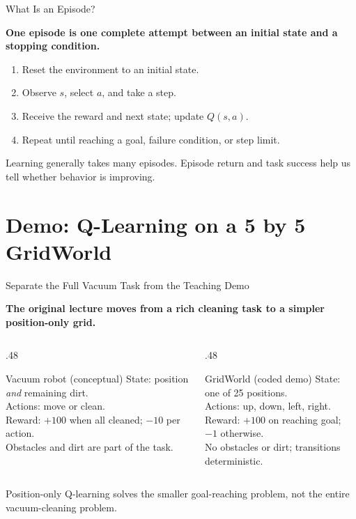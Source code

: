 \documentclass[aspectratio=169,10pt]{beamer}
\newcommand{\conceptlead}[1]{{\small\bfseries\color{CalPolyGreen}#1\par}}
\begin{document}
\begin{frame}{What Is an Episode?}
\small
\conceptlead{One episode is one complete attempt between an initial state and a stopping condition.}
\begin{enumerate}
\item Reset the environment to an initial state.
\item Observe $s$, select $a$, and take a step.
\item Receive the reward and next state; update $Q(s,a)$.
\item Repeat until reaching a goal, failure condition, or step limit.
\end{enumerate}
\begin{keyidea}Learning generally takes many episodes. Episode return and task success help us tell whether behavior is improving.\end{keyidea}
\end{frame}

\section{Demo: Q-Learning on a 5 by 5 GridWorld}

\begin{frame}{Separate the Full Vacuum Task from the Teaching Demo}
\small
\conceptlead{The original lecture moves from a rich cleaning task to a simpler position-only grid.}
\begin{columns}[T,onlytextwidth]
\begin{column}{.48\textwidth}
\begin{block}{Vacuum robot (conceptual)}
State: position \emph{and} remaining dirt.\\[4pt]
Actions: move or clean.\\[4pt]
Reward: $+100$ when all cleaned; $-10$ per action.\\[4pt]
Obstacles and dirt are part of the task.
\end{block}
\end{column}
\begin{column}{.48\textwidth}
\begin{block}{GridWorld (coded demo)}
State: one of 25 positions.\\[4pt]
Actions: up, down, left, right.\\[4pt]
Reward: $+100$ on reaching goal; $-1$ otherwise.\\[4pt]
No obstacles or dirt; transitions deterministic.
\end{block}
\end{column}
\end{columns}
\begin{keyidea}Position-only Q-learning solves the smaller goal-reaching problem, not the entire vacuum-cleaning problem.\end{keyidea}
\end{frame}
\end{document}
